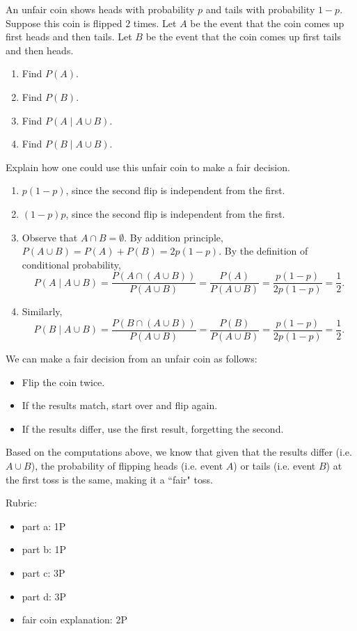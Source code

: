 \documentclass{article}
\theoremstyle{definition}
\begin{document}
\begin{question}
    An unfair coin shows heads with probability $p$ and tails with probability
    $1-p$. Suppose this coin is flipped $2$ times. Let $A$ be the event that the coin comes up first heads and
    then tails.  Let $B$ be the event that the coin comes up first tails and
    then heads.
    \begin{enumerate}
        \item  Find $P(A)$.
        \item  Find $P(B)$.
        \item  Find $P(A \mid A \cup B)$.
        \item  Find $P(B \mid A \cup B)$.
    \end{enumerate}
    Explain how one could use this unfair coin to make a fair decision.
\end{question}
\begin{solution}
    \begin{enumerate}
        \item $p(1-p)$, since the second flip is independent from the first.
        \item $(1-p)p$, since the second flip is independent from the first.
        \item Observe that $A \cap B = \emptyset$.  By addition principle, $P(A
        \cup B) = P(A )+ P(B) = 2p(1-p)$. By the definition of conditional
        probability,
            \[
                P(A \mid A \cup B) = \frac{P(A \cap (A \cup B))}{P(A\cup B)}
                = \frac{P(A)}{P(A\cup B)} = \frac{p(1-p)}{2p(1-p)} = \frac{1}{2}.
            \]
        \item Similarly,
            \[
                P(B  \mid  A \cup B) = \frac{P(B \cap (A \cup B))}{P(A\cup B)}
                    = \frac{P(B)}{P(A\cup B)} = \frac{p(1-p)}{2p(1-p)} = \frac{1}{2}.
            \]
    \end{enumerate}
    We can make a fair decision from an unfair coin as follows:
    \begin{itemize}
        \item Flip the coin twice.
        \item If the results match, start over and flip again.
        \item If the results differ, use the first result, forgetting the second.
    \end{itemize}
    Based on the computations above, we know that given that the results differ
    (i.e. $A\cup B$), the probability of flipping heads (i.e. event $A$) or
    tails (i.e. event $B$) at the first toss is the same, making it a ``fair"
    toss.
    
{\color{red} Rubric:
\begin{itemize}
\item part a: 1P
\item part b: 1P
\item part c: 3P
\item part d: 3P
\item fair coin explanation: 2P
\end{itemize}}
\end{solution}
\end{document}
